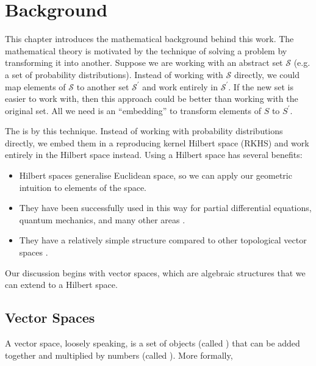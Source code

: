 \chapter{Background}
This chapter introduces the mathematical background behind this work. The mathematical theory is motivated by the technique of solving a problem by transforming it into another. Suppose we are working with an abstract set $\mathcal{S}$ (e.g. a set of probability distributions). Instead of working with $\mathcal{S}$ directly, we could map elements of $\mathcal{S}$ to another set $\mathcal{S}^\prime$ and work entirely in $\mathcal{S}^\prime$. If the new set is easier to work with, then this approach could be better than working with the original set. All we need is an ``embedding'' to transform elements of $S$ to $S^\prime$.

The  is  by this technique. Instead of working with probability distributions directly, we embed them in a reproducing kernel Hilbert space (RKHS) and work entirely in the Hilbert space instead. Using a Hilbert space has several benefits:
%
\begin{itemize}
  \item Hilbert spaces generalise Euclidean space, so we can apply our geometric intuition to elements of the space.
  \item They have been successfully used in this way for partial differential equations, quantum mechanics, and many other areas \needcite.
  \item They have a relatively simple structure compared to other topological vector spaces \needcite.
\end{itemize}
%
Our discussion begins with vector spaces, which are algebraic structures that we can extend to a Hilbert space. 

\section{Vector Spaces}
A vector space, loosely speaking, is a set of objects (called ) that can be added together and multiplied by numbers (called ). More formally,

